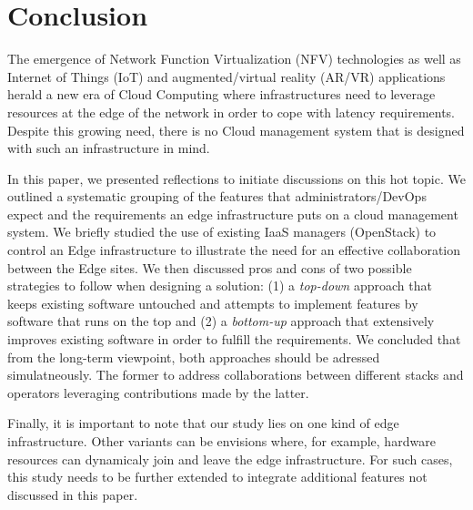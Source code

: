 
\section{Conclusion}
\label{sec:conclusion}

The emergence of Network Function Virtualization (NFV) technologies as
well as Internet of Things (IoT) and augmented/virtual reality (AR/VR)
applications herald a new era of Cloud Computing where infrastructures
need to leverage resources at the edge of the network in order to cope
with latency requirements.  Despite this growing need, there is no
Cloud management system that is designed with such an infrastructure
in mind.

In this paper, we presented reflections to initiate discussions on this
hot topic. We outlined a systematic grouping of the features that
administrators/DevOps expect and the requirements an edge
infrastructure puts on a cloud management system.
We briefly studied the use of existing IaaS managers (\ie OpenStack)
to control an Edge infrastructure to illustrate the need for an
effective collaboration between the Edge sites.  We then discussed
pros and cons of two possible strategies to follow when designing a
solution: (1) a \emph{top-down} approach that keeps existing software
untouched and attempts to implement features by software that runs on
the top and (2) a \emph{bottom-up} approach that extensively improves
existing software in order to fulfill the requirements. We concluded
that from the long-term viewpoint, both approaches should be adressed
simulatneously. The former to address collaborations between different stacks and operators leveraging contributions made by the latter.

Finally, it is important to note that our study lies on one kind of
edge infrastructure. Other variants can be envisions where, for
example, hardware resources can dynamicaly join and leave the edge
infrastructure. For such cases, this study needs to be further
extended to integrate additional features not discussed in this paper.

